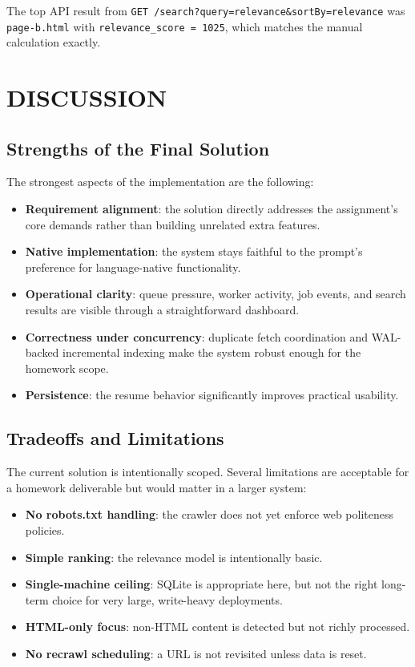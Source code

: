 \documentclass[pdftex,12pt,a4paper]{article}
\begin{document}
The top API result from \texttt{GET /search?query=relevance\&sortBy=relevance} was \texttt{page-b.html} with \texttt{relevance\_score = 1025}, which matches the manual calculation exactly.

\section{DISCUSSION}
\label{sec:discussion}

\subsection{Strengths of the Final Solution}

The strongest aspects of the implementation are the following:

\begin{itemize}
    \item \textbf{Requirement alignment}: the solution directly addresses the assignment's core demands rather than building unrelated extra features.
    \item \textbf{Native implementation}: the system stays faithful to the prompt's preference for language-native functionality.
    \item \textbf{Operational clarity}: queue pressure, worker activity, job events, and search results are visible through a straightforward dashboard.
    \item \textbf{Correctness under concurrency}: duplicate fetch coordination and WAL-backed incremental indexing make the system robust enough for the homework scope.
    \item \textbf{Persistence}: the resume behavior significantly improves practical usability.
\end{itemize}

\subsection{Tradeoffs and Limitations}

The current solution is intentionally scoped. Several limitations are acceptable for a homework deliverable but would matter in a larger system:

\begin{itemize}
    \item \textbf{No robots.txt handling}: the crawler does not yet enforce web politeness policies.
    \item \textbf{Simple ranking}: the relevance model is intentionally basic.
    \item \textbf{Single-machine ceiling}: SQLite is appropriate here, but not the right long-term choice for very large, write-heavy deployments.
    \item \textbf{HTML-only focus}: non-HTML content is detected but not richly processed.
    \item \textbf{No recrawl scheduling}: a URL is not revisited unless data is reset.
\end{itemize}
\end{document}
